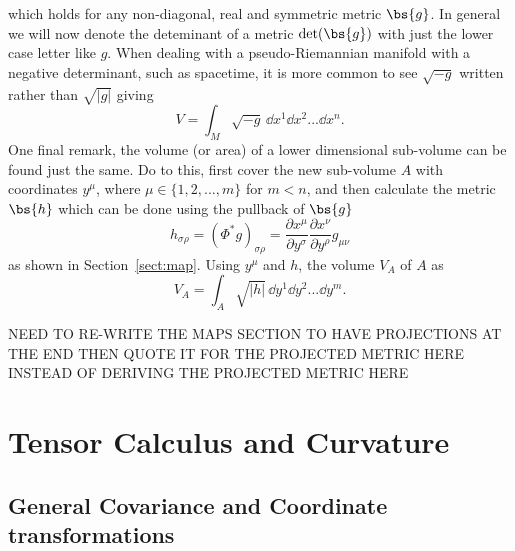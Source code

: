 which holds for any non-diagonal, real and symmetric metric $\bs{g}$. In general we will now denote the deteminant of a metric $\det(\bs{g})$ with just the lower case letter like $g$. When dealing with a pseudo-Riemannian manifold with a negative determinant, such as spacetime, it is more common to see $\sqrt{-g}$ written rather than $\sqrt{|g|}$ giving
\begin{equation}
V = \int_{M}\sqrt{-g} \,\dd {x}^1 \dd {x}^2 ... \dd {x}^n.
\end{equation}
One final remark, the volume (or area) of a lower dimensional sub-volume can be found just the same. Do to this, first cover the new sub-volume $A$ with coordinates $y^\mu$, where $\mu\in\{1,2,...,m\}$ for $m<n$, and then calculate the metric $\bs{h}$ which can be done using the pullback of $\bs{g}$
\begin{equation}
h_{\sigma\rho} = (\Phi^* g)_{\sigma\rho}= \frac{\partial x^\mu}{\partial y^\sigma} \frac{\partial x^\nu}{\partial y^\rho} g_{\mu\nu}
\end{equation}
as shown in Section~\ref{sect:map}. Using $y^\mu$ and $h$, the volume $V_A$ of $A$ as 
\begin{equation}
V_A = \int_{A}\sqrt{|h|} \,\dd {y}^1 \dd {y}^2 ... \dd {y}^m.
\end{equation}

NEED TO RE-WRITE THE MAPS SECTION TO HAVE PROJECTIONS AT THE END THEN QUOTE IT FOR THE PROJECTED METRIC HERE INSTEAD OF DERIVING THE PROJECTED METRIC HERE


\section{Tensor Calculus and Curvature}


\subsection{General Covariance and Coordinate transformations}\label{sec:cov}

